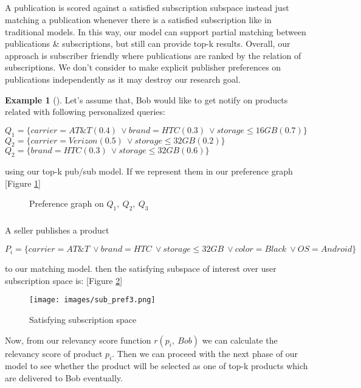 \documentclass[a4paper,12pt,oneside]{book}
\theoremstyle{definition}
\newtheorem{example}{Example}[section]
\theoremstyle{remark}
\begin{document}
\subparagraph*{}
A publication is scored against a satisfied subscription subspace instead just matching a publication whenever there is a satisfied subscription like in traditional models. In this way, our model can support partial matching between publications \& subscriptions, but still can provide top-k results. Overall, our approach is subscriber friendly where publications are ranked by the relation of subscriptions. We don't consider to make explicit publisher preferences on publications independently as it may destroy our research goal.



\begin{example}[\label{ex:subs}]
Let's assume that, Bob would like to get notify on products related with following personalized queries:
\begin{center}
$Q_1=\{carrier=AT\&T(0.4)\ \vee brand=HTC(0.3)\ \vee storage\leq16GB(0.7)\}$
$Q_2=\{carrier=Verizon(0.5)\ \vee storage\leq32GB(0.2)\}$
$Q_2=\{brand=HTC(0.3)\ \vee storage\leq32GB(0.6)\}$
\end{center}
using our top-k pub/sub model. If we represent them in our preference graph [Figure \ref{pref_graph}]

\begin{figure}[h]
\centering
    \qquad
    \caption{Preference graph on $Q_1,\ Q_2,\ Q_3$}
    \label{pref_graph}%
\end{figure}

\subparagraph*{}
A seller publishes a product 
\begin{center}
$P_i=\{carrier=AT\&T\ \vee brand=HTC\ \vee storage\leq32GB\ \vee color=Black\ \vee OS=Android\} $
\end{center}
to our matching model. then the satisfying subspace of interest over user subscription space is: [Figure \ref{pref_graph2}]

\begin{figure}[h]
\begin{center}
\texttt{[image: images/sub\_pref3.png]}
\caption{Satisfying subscription space}
\label{pref_graph2}
\end{center}
\end{figure}

Now, from our relevancy score function $r(p_i,\ Bob)$ we can calculate the relevancy score of product $p_i$. Then we can proceed with the next phase of our model to see whether the product will be selected as one of top-k products which are delivered to Bob eventually.
\end{example}
\end{document}
